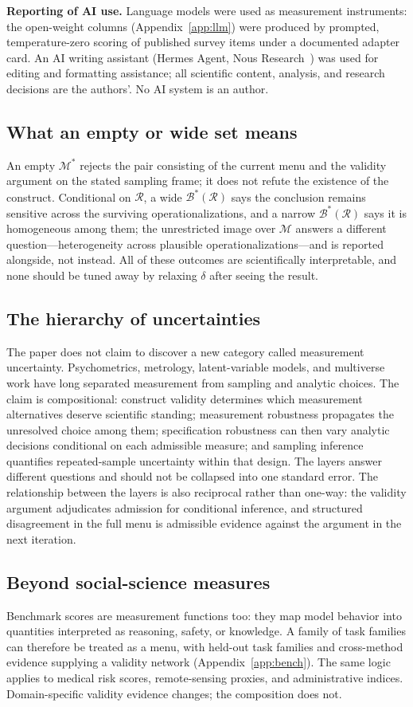 \documentclass[10pt,letterpaper]{article}
\newcommand{\M}{\ensuremath{\mathcal{M}}}
\newcommand{\Rset}{\mathcal{R}}
\newcommand{\Bset}{\mathcal{B}}
\begin{document}
\textbf{Reporting of AI use.}
Language models were used as measurement instruments: the open-weight columns (Appendix~\ref{app:llm}) were produced by prompted, temperature-zero scoring of published survey items under a documented adapter card.
An AI writing assistant (Hermes Agent, Nous Research~\cite{hermesagent}) was used for editing and formatting assistance; all scientific content, analysis, and research decisions are the authors'.
No AI system is an author.

\subsection{What an empty or wide set means}
An empty $\M^*$ rejects the pair consisting of the current menu and the validity argument on the stated sampling frame; it does not refute the existence of the construct.
Conditional on $\Rset$, a wide $\Bset^*(\Rset)$ says the conclusion remains sensitive across the surviving operationalizations, and a narrow $\Bset^*(\Rset)$ says it is homogeneous among them; the unrestricted image over $\M$ answers a different question---heterogeneity across plausible operationalizations---and is reported alongside, not instead.
All of these outcomes are scientifically interpretable, and none should be tuned away by relaxing $\delta$ after seeing the result.

\subsection{The hierarchy of uncertainties}
The paper does not claim to discover a new category called measurement uncertainty.
Psychometrics, metrology, latent-variable models, and multiverse work have long separated measurement from sampling and analytic choices.
The claim is compositional: construct validity determines which measurement alternatives deserve scientific standing; measurement robustness propagates the unresolved choice among them; specification robustness can then vary analytic decisions conditional on each admissible measure; and sampling inference quantifies repeated-sample uncertainty within that design.
The layers answer different questions and should not be collapsed into one standard error.
The relationship between the layers is also reciprocal rather than one-way: the validity argument adjudicates admission for conditional inference, and structured disagreement in the full menu is admissible evidence against the argument in the next iteration.

\subsection{Beyond social-science measures}
Benchmark scores are measurement functions too: they map model behavior into quantities interpreted as reasoning, safety, or knowledge.
A family of task families can therefore be treated as a menu, with held-out task families and cross-method evidence supplying a validity network (Appendix~\ref{app:bench}).
The same logic applies to medical risk scores, remote-sensing proxies, and administrative indices.
Domain-specific validity evidence changes; the composition does not.
\end{document}
